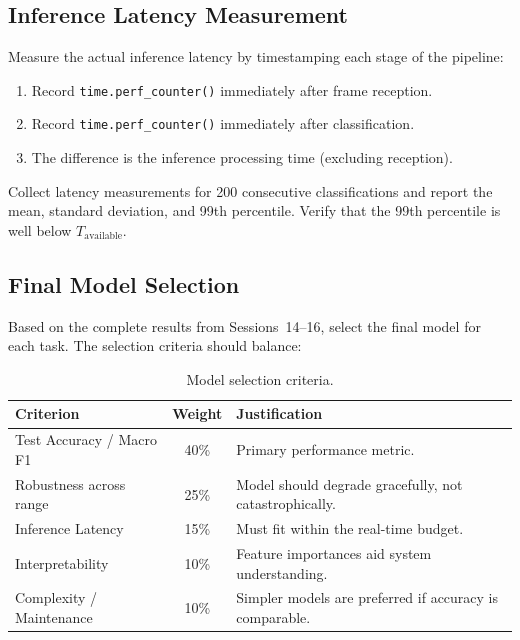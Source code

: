 \documentclass[11pt,letterpaper]{article}
\begin{document}
	\subsection{Inference Latency Measurement}

	Measure the actual inference latency by timestamping each stage of the pipeline:

	\begin{enumerate}[leftmargin=2em]
		\item Record \texttt{time.perf\_counter()} immediately after \UART{} frame reception.
		\item Record \texttt{time.perf\_counter()} immediately after classification.
		\item The difference is the inference processing time (excluding \UART{} reception).
	\end{enumerate}

	Collect latency measurements for 200 consecutive classifications and report the mean, standard deviation, and 99th percentile. Verify that the 99th percentile is well below $T_{\text{available}}$.

	\subsection{Final Model Selection}

	Based on the complete results from Sessions~14--16, select the final model for each task. The selection criteria should balance:

	\begin{table}[ht!]
		\centering
		\caption{Model selection criteria.}
		\label{tab:selection}
		\renewcommand{\arraystretch}{1.3}
		\begin{tabularx}{\textwidth}{l c X}
			\toprule
			\textbf{Criterion} & \textbf{Weight} & \textbf{Justification} \\
			\midrule
			Test Accuracy / Macro F1 & 40\% & Primary performance metric. \\
			Robustness across \SNR{} range & 25\% & Model should degrade gracefully, not catastrophically. \\
			Inference Latency & 15\% & Must fit within the real-time budget. \\
			Interpretability & 10\% & Feature importances aid system understanding. \\
			Complexity / Maintenance & 10\% & Simpler models are preferred if accuracy is comparable. \\
			\bottomrule
		\end{tabularx}
	\end{table}
\end{document}
